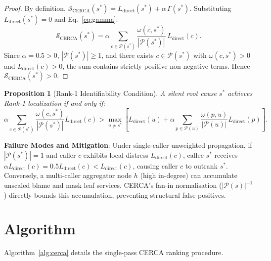 \documentclass[conference]{IEEEtran}
\newtheorem{proposition}{Proposition}
\begin{document}
\begin{proof}
By definition, $\mathcal{S}_{\mathrm{CERCA}}(s^*)=L_{\mathrm{direct}}(s^*)+\alpha\,\Gamma(s^*)$. Substituting $L_{\mathrm{direct}}(s^*)=0$ and Eq.~\eqref{eq:gamma}:
\begin{equation}
\mathcal{S}_{\mathrm{CERCA}}(s^*)=\alpha\sum_{c\in\mathcal{P}(s^*)}\frac{\omega(c,s^*)}{|\mathcal{P}(s^*)|}\,L_{\mathrm{direct}}(c).
\end{equation}
Since $\alpha=0.5>0$, $|\mathcal{P}(s^*)|\geq 1$, and there exists $c\in\mathcal{P}(s^*)$ with $\omega(c,s^*)>0$ and $L_{\mathrm{direct}}(c)>0$, the sum contains strictly positive non-negative terms. Hence $\mathcal{S}_{\mathrm{CERCA}}(s^*)>0$.
\end{proof}

\begin{proposition}[Rank-1 Identifiability Condition]
\label{prop:identifiability}
A silent root cause $s^*$ achieves Rank-1 localization if and only if:
\begin{equation}
\alpha\sum_{c\in\mathcal{P}(s^*)}\frac{\omega(c,s^*)}{|\mathcal{P}(s^*)|}L_{\mathrm{direct}}(c)>\max_{u\neq s^*}\left[L_{\mathrm{direct}}(u)+\alpha\sum_{p\in\mathcal{P}(u)}\frac{\omega(p,u)}{|\mathcal{P}(u)|}L_{\mathrm{direct}}(p)\right].
\end{equation}
\end{proposition}

\textbf{Failure Modes and Mitigation}: Under single-caller unweighted propagation, if $|\mathcal{P}(s^*)|=1$ and caller $c$ exhibits local distress $L_{\mathrm{direct}}(c)$, callee $s^*$ receives $\alpha L_{\mathrm{direct}}(c)=0.5 L_{\mathrm{direct}}(c)<L_{\mathrm{direct}}(c)$, causing caller $c$ to outrank $s^*$. Conversely, a multi-caller aggregator node $h$ (high in-degree) can accumulate unscaled blame and mask leaf services. CERCA's fan-in normalisation ($|\mathcal{P}(s)|^{-1}$) directly bounds this accumulation, preventing structural false positives.

\section{Algorithm}

Algorithm~\ref{alg:cerca} details the single-pass CERCA ranking procedure.
\end{document}
